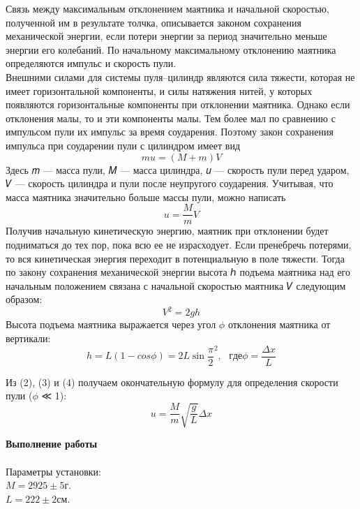 \documentclass[12pt]{article}
\begin{document}
    Связь между максимальным отклонением маятника и начальной
    скоростью, полученной им в результате толчка, описывается законом
    сохранения механической энергии, если потери энергии за период значительно меньше энергии его колебаний. По начальному максимальному отклонению маятника определяются импульс и скорость пули. \\ 
    
    Внешними силами для системы пуля–цилиндр являются сила тяжести, которая не имеет горизонтальной компоненты, и силы натяжения
    нитей, у которых появляются горизонтальные компоненты при отклонении маятника. Однако если отклонения малы, то и эти компоненты
    малы. Тем более мал по сравнению с импульсом пули их импульс за
    время соударения. Поэтому закон сохранения импульса при соударении
    пули с цилиндром имеет вид 
    \begin{equation}
    	mu=(M+m)V
    \end{equation}
    Здесь 𝑚 — масса пули, 𝑀 — масса цилиндра, 𝑢 — скорость пули перед
    ударом, 𝑉 — скорость цилиндра и пули после неупругого соударения.
    Учитывая, что масса маятника значительно больше массы пули,
    можно написать
    \begin{equation}
    	u = \frac{M}{m}V
    \end{equation}
    Получив начальную кинетическую энергию, маятник при отклонении будет подниматься до тех пор, пока всю ее не израсходует. Если
    пренебречь потерями, то вся кинетическая энергия переходит в потенциальную в поле тяжести. Тогда по закону сохранения механической
    энергии высота ℎ подъема маятника над его начальным положением
    связана с начальной скоростью маятника 𝑉 следующим образом:
    \begin{equation}
    	V^2=2gh
    \end{equation}
    Высота подъема маятника выражается через угол $\phi$ отклонения маятника от вертикали:
    \begin{equation}
    	h = L(1-cos\phi)=2L\sin\frac{\pi}{2}^2, \mbox{ } где \phi = \frac{\Delta x}{L}
    \end{equation}
    
    Из (2), (3) и (4) получаем окончательную формулу для определения
    скорости пули ($\phi$ ≪ 1):
    \begin{equation}
        u = \frac{M}{m}\sqrt{\frac{g}{L}}\Delta x
    \end{equation}
    
    \pagebreak
    
    \textbf{\large Выполнение работы} \\ \\
     Параметры установки: \\
     $M = 2925 \pm 5 г.$ \\
     $L = 222 \pm 2 см.$ \\
     
\end{document}
